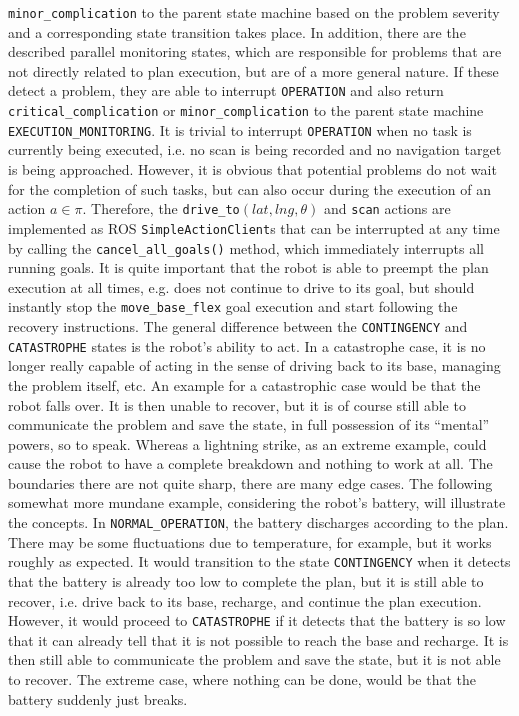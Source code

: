 \documentclass[english, master, utf8]{base/thesis_KBS}
\newcommand{\code}[1]{\colorbox{light-gray}{\texttt{#1}}}
\begin{document}
\code{minor\_complication} to the parent state machine based on the problem severity and a corresponding state transition takes place.
In addition, there are the described parallel monitoring states, which are responsible for problems that are not directly related to plan execution, but are of a more general nature.
If these detect a problem, they are able to interrupt \code{OPERATION} and also return \code{critical\_complication} or \code{minor\_complication} to the parent state machine
\code{EXECUTION\_MONITORING}. It is trivial to interrupt \code{OPERATION} when no task is currently being executed, i.e. no scan is being recorded and no navigation target 
is being approached. However, it is obvious that potential problems do not wait for the completion of such tasks, but can also occur during the execution of an action $a \in \pi$.
Therefore, the \code{drive\_to$(lat, lng, \theta)$} and \code{scan} actions are implemented as ROS \code{SimpleActionClient}s that can be interrupted at any time
by calling the \code{cancel\_all\_goals()} method, which immediately interrupts all running goals. It is quite important that the robot is able to preempt the plan 
execution at all times, e.g. does not continue to drive to its goal, but should instantly stop the \code{move\_base\_flex} goal execution and start following the
recovery instructions.\newline
The general difference between the \code{CONTINGENCY} and \code{CATASTROPHE} states is the robot's ability to act. 
In a catastrophe case, it is no longer really capable of acting in the sense of driving back to its base, managing the problem itself, etc. 
An example for a catastrophic case would be that the robot falls over. It is then unable to recover, but it is of course still able to communicate the problem
and save the state, in full possession of its ``mental'' powers, so to speak. Whereas a lightning strike, as an extreme example, could cause the robot to have a 
complete breakdown and nothing to work at all. The boundaries there are not quite sharp, there are many edge cases.
The following somewhat more mundane example, considering the robot's battery, will illustrate the concepts.
In \code{NORMAL\_OPERATION}, the battery discharges according to the plan. There may be some fluctuations due to temperature, for example, but it works roughly as expected.
It would transition to the state \code{CONTINGENCY} when it detects that the battery is already too low to complete the plan, but it is still able to recover,
i.e. drive back to its base, recharge, and continue the plan execution. However, it would proceed to \code{CATASTROPHE} if it detects that the battery is so low
that it can already tell that it is not possible to reach the base and recharge. It is then still able to communicate the problem and save the state, but it is not able
to recover. The extreme case, where nothing can be done, would be that the battery suddenly just breaks.
\end{document}

